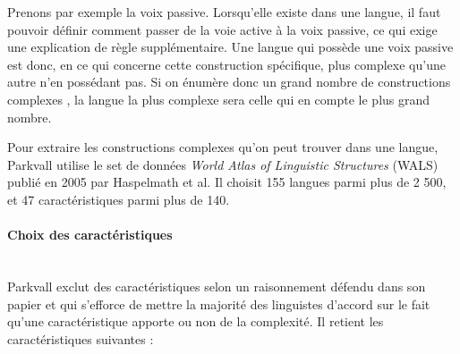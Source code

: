 \documentclass[a4paper, twoside, 12pt]{article}
\newcommand{\myparagraph}[1]{\paragraph{#1}\mbox{}\\}
\begin{document}
    Prenons par exemple la voix passive. Lorsqu’elle existe dans une langue, il faut pouvoir définir comment passer de la voie active à la voix passive, ce qui exige une explication de règle supplémentaire. Une langue qui possède une voix passive est donc, en ce qui concerne cette construction spécifique, plus complexe qu’une autre n’en possédant pas. Si on énumère donc un grand nombre de \og constructions complexes \fg{}, la langue la plus complexe sera celle qui en compte le plus grand nombre.

    Pour extraire les \og constructions complexes \fg{} qu’on peut trouver dans une langue, Parkvall utilise le set de données \textit{World Atlas of Linguistic Structures} (WALS) publié en 2005 par Haspelmath et al. Il choisit 155 langues parmi plus de 2 500, et 47 caractéristiques parmi plus de 140.

    \myparagraph{Choix des caractéristiques}

    Parkvall exclut des caractéristiques selon un raisonnement défendu dans son papier et qui s’efforce de mettre la majorité des linguistes d’accord sur le fait qu’une caractéristique apporte ou non de la complexité. Il retient les caractéristiques suivantes : \par
\end{document}
